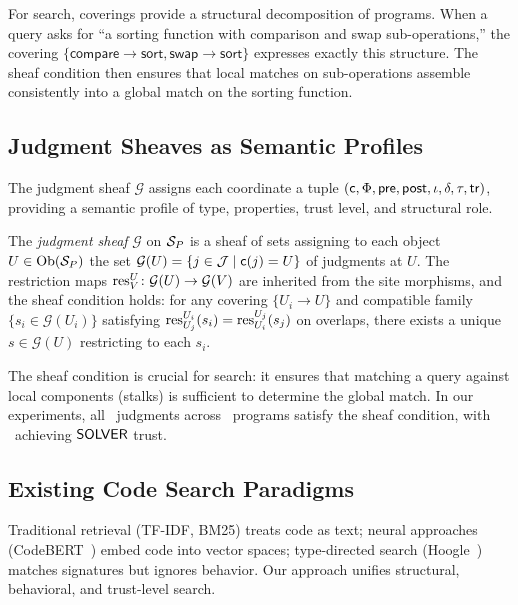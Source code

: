 \documentclass[11pt]{article}
\newcommand{\props}{\Phi}                           %
\newcommand{\precond}{\mathsf{pre}}                  %
\newcommand{\postcond}{\mathsf{post}}                %
\newcommand{\inv}{\iota}                             %
\newcommand{\tr}{\mathsf{tr}}                        %
\begin{document}
For search, coverings provide a structural decomposition of programs.
When a query asks for ``a sorting function with comparison and swap
sub-operations,'' the covering $\{\mathsf{compare} \to \mathsf{sort},
\mathsf{swap} \to \mathsf{sort}\}$ expresses exactly this structure.
The sheaf condition then ensures that local matches on sub-operations
assemble consistently into a global match on the sorting function.

\subsection{Judgment Sheaves as Semantic Profiles}
The judgment sheaf $\mathcal{G}$ assigns each coordinate a tuple
$(\coord, \props, \precond, \postcond, \inv, \delta, \tau, \tr)$,
providing a semantic profile of type, properties, trust level, and
structural role.

\begin{definition}\label{def:judgment-sheaf}
The \emph{judgment sheaf} $\mathcal{G}$ on $\mathcal{S}_P$ is a sheaf of sets
assigning to each object $U \in \mathrm{Ob}(\mathcal{S}_P)$ the set
$\mathcal{G}(U) = \{j \in \mathcal{J} \mid \mathsf{c}(j) = U\}$ of judgments at $U$.
The restriction maps
$\mathrm{res}_{V}^{U} \colon \mathcal{G}(U) \to \mathcal{G}(V)$
are inherited from the site morphisms, and the sheaf condition holds:
for any covering $\{U_i \to U\}$ and compatible family
$\{s_i \in \mathcal{G}(U_i)\}$ satisfying $\mathrm{res}_{U_j}^{U_i}(s_i) =
\mathrm{res}_{U_i}^{U_j}(s_j)$ on overlaps, there exists a unique
$s \in \mathcal{G}(U)$ restricting to each $s_i$.
\end{definition}

The sheaf condition is crucial for search: it ensures that matching a
query against local components (stalks) is sufficient to determine the
global match.  In our experiments, all \compTrustTotal\ judgments across
\compTotalPrograms\ programs satisfy the sheaf condition, with
\compTrustSolverdischargedPct\ achieving $\mathsf{SOLVER}$ trust.

\subsection{Existing Code Search Paradigms}
Traditional retrieval (TF-IDF, BM25) treats code as text; neural
approaches (CodeBERT~\cite{CodeBERT2020}) embed code into vector spaces;
type-directed search (Hoogle~\cite{Hoogle2004}) matches signatures but
ignores behavior.  Our approach unifies structural, behavioral, and
trust-level search.
\end{document}
